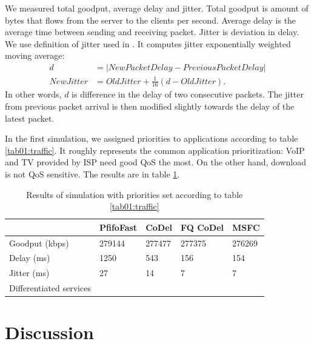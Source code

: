 We measured total goodput, average delay and jitter. Total goodput is amount of bytes that flows from the server to the clients per second. Average delay is the average time between sending and receiving packet. Jitter is deviation in delay. We use definition of jitter used in \cite{rfc1889}. It computes jitter exponentially weighted moving average:
\begin{align*} 
d &= |NewPacketDelay - PreviousPacketDelay| \\
NewJitter &= OldJitter + \frac{1}{16} (d - OldJitter).
\end{align*}
In other words, $d$ is difference in the delay of two consecutive packets. The jitter from previous packet arrival is then modified slightly towards the delay of the latest packet.

In the first simulation, we assigned priorities to applications according to table \ref{tab01:traffic}. It roughly represents the common application prioritization: VoIP and TV provided by ISP need good QoS the most. On the other hand, download is not QoS sensitive. The results are in table \ref{tab02:results}.




\begin{table}[]
	\centering
	\caption{Results of simulation with priorities set according to table \ref{tab01:traffic}}
	\label{tab02:results}
	\begin{tabular}{lllll}
		\hline
		& PfifoFast & CoDel  & FQ CoDel & MSFC   \\ \hline
		Goodput (kbps)          & 279144    & 277477 & 277375   & 276269 \\
		Delay (ms)              & 1250      & 543    & 156      & 154    \\
		Jitter (ms)             & 27        & 14     & 7        & 7      \\
		Differentiated services &           &        &          &        \\ \hline
	\end{tabular}
\end{table}







\section{Discussion}